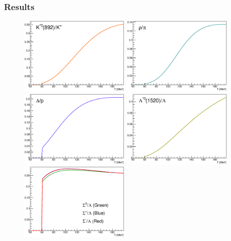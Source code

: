 \subsubsection{Results}
\begin{figure}[!htbp]
\begin{center}
        \includegraphics[width=200px]{./Version1/FigChapter2/KStarToK}
       \includegraphics[width=200px]{./Version1/FigChapter2/RhoToPion}
        \includegraphics[width=200px]{./Version1/FigChapter2/DeltaToProton}
		\includegraphics[width=200px]{./Version1/FigChapter2/LambdaStarToLambda}
		\includegraphics[width=200px]{./Version1/FigChapter2/SigmaRatio}

\end{center}
\end{figure}
